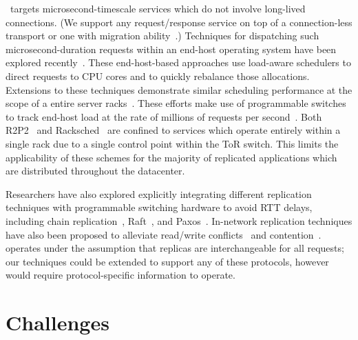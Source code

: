 \daronpon\ targets microsecond-timescale services which
do not involve long-lived connections.
(We support any request/response service on top of a connection-less
transport or one with migration ability~\cite{crab,quic}.)  Techniques
for dispatching such microsecond-duration requests within an end-host
operating system have been explored recently~\cite{IX, shinjuku:nsdi:2019, snap:sosp:2019,
shenango:nsdi:2019, zygos}.  These end-host-based approaches use load-aware
schedulers to direct requests to CPU cores and to quickly rebalance
those allocations.  Extensions to these techniques demonstrate similar
scheduling performance at the scope of a entire server
racks~\cite{r2p2, racksched}. These efforts make use of programmable
switches to track end-host load at the rate of millions of requests
per second~\cite{tofino2}. Both R2P2~\cite{r2p2} and
Racksched~\cite{racksched} are confined to services which operate
entirely within a single rack due to a single control point within the
ToR switch. This limits the applicability of these schemes for the
majority of replicated applications which are distributed throughout
the datacenter.

Researchers have also explored explicitly integrating different
replication techniques with programmable switching hardware to avoid
RTT delays, including chain replication~\cite{netchain},
Raft~\cite{hovercraft}, and Paxos~\cite{nopaxos}.  In-network
replication techniques have also been proposed to alleviate
read/write conflicts~\cite{harmonia} and
contention~\cite{pegasus}. 
%
\daronpon operates under the assumption
that replicas are interchangeable for all requests; our
techniques could be extended to support any of these protocols, however
\daronpon would require protocol-specific information to operate.

\section{Challenges}
\label{daronpon:sec:challenges}

